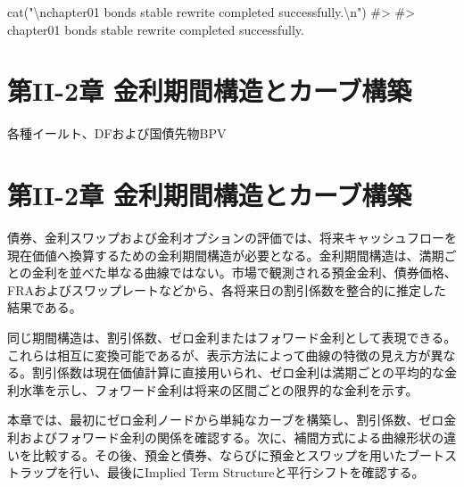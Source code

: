 \documentclass[
  letterpaper,
  DIV=11,
  numbers=noendperiod]{scrreprt}
\newenvironment{Shaded}{\begin{snugshade}}{\end{snugshade}}
\newcommand{\AttributeTok}[1]{\textcolor[rgb]{0.40,0.45,0.13}{#1}}
\newcommand{\CommentTok}[1]{\textcolor[rgb]{0.37,0.37,0.37}{#1}}
\newcommand{\ConstantTok}[1]{\textcolor[rgb]{0.56,0.35,0.01}{#1}}
\newcommand{\FunctionTok}[1]{\textcolor[rgb]{0.28,0.35,0.67}{#1}}
\newcommand{\NormalTok}[1]{\textcolor[rgb]{0.00,0.23,0.31}{#1}}
\newcommand{\SpecialCharTok}[1]{\textcolor[rgb]{0.37,0.37,0.37}{#1}}
\newcommand{\StringTok}[1]{\textcolor[rgb]{0.13,0.47,0.30}{#1}}
\begin{document}
\begin{Shaded}
\begin{Highlighting}[]
\FunctionTok{cat}\NormalTok{(}\StringTok{"}\SpecialCharTok{\textbackslash{}n}\StringTok{chapter01 bonds stable rewrite completed successfully.}\SpecialCharTok{\textbackslash{}n}\StringTok{"}\NormalTok{)}
\CommentTok{\#\textgreater{} }
\CommentTok{\#\textgreater{} chapter01 bonds stable rewrite completed successfully.}
\end{Highlighting}
\end{Shaded}

\chapter{第II-2章
金利期間構造とカーブ構築}\label{ux7b2cii-2ux7ae0-ux91d1ux5229ux671fux9593ux69cbux9020ux3068ux30abux30fcux30d6ux69cbux7bc9}

各種イールト、DFおよび国債先物BPV

\hfill\break

\chapter{第II-2章
金利期間構造とカーブ構築}\label{ux7b2cii-2ux7ae0-ux91d1ux5229ux671fux9593ux69cbux9020ux3068ux30abux30fcux30d6ux69cbux7bc9-1}

債券、金利スワップおよび金利オプションの評価では、将来キャッシュフローを現在価値へ換算するための金利期間構造が必要となる。金利期間構造は、満期ごとの金利を並べた単なる曲線ではない。市場で観測される預金金利、債券価格、FRAおよびスワップレートなどから、各将来日の割引係数を整合的に推定した結果である。

同じ期間構造は、割引係数、ゼロ金利またはフォワード金利として表現できる。これらは相互に変換可能であるが、表示方法によって曲線の特徴の見え方が異なる。割引係数は現在価値計算に直接用いられ、ゼロ金利は満期ごとの平均的な金利水準を示し、フォワード金利は将来の区間ごとの限界的な金利を示す。

本章では、最初にゼロ金利ノードから単純なカーブを構築し、割引係数、ゼロ金利およびフォワード金利の関係を確認する。次に、補間方式による曲線形状の違いを比較する。その後、預金と債券、ならびに預金とスワップを用いたブートストラップを行い、最後にImplied
Term Structureと平行シフトを確認する。

\begin{Shaded}
\end{Shaded}
\end{document}
